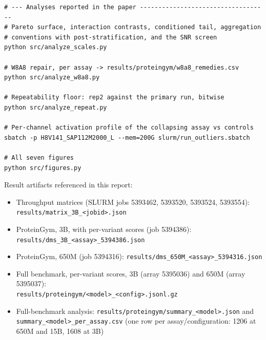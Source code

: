 \documentclass[11pt]{article}
\begin{document}
\begin{footnotesize}
\begin{verbatim}
# --- Analyses reported in the paper -----------------------------------
# Pareto surface, interaction contrasts, conditioned tail, aggregation
# conventions with post-stratification, and the SNR screen
python src/analyze_scales.py

# W8A8 repair, per assay -> results/proteingym/w8a8_remedies.csv
python src/analyze_w8a8.py

# Repeatability floor: rep2 against the primary run, bitwise
python src/analyze_repeat.py

# Per-channel activation profile of the collapsing assay vs controls
sbatch -p H8V141_SAP112M2000_L --mem=200G slurm/run_outliers.sbatch

# All seven figures
python src/figures.py
\end{verbatim}
\end{footnotesize}

\noindent
Result artifacts referenced in this report:

\begin{footnotesize}
\begin{itemize}\setlength{\itemsep}{0pt}
  \item Throughput matrices (SLURM jobs 5393462, 5393520, 5393524, 5393554):\\
        \texttt{results/matrix\_3B\_<jobid>.json}
  \item ProteinGym, 3B, with per-variant scores (job 5394386):\\
        \texttt{results/dms\_3B\_<assay>\_5394386.json}
  \item ProteinGym, 650M (job 5394316):
        \texttt{results/dms\_650M\_<assay>\_5394316.json}
  \item Full benchmark, per-variant scores, 3B (array 5395036) and
        650M (array 5395037):\\
        \texttt{results/proteingym/<model>\_<config>.jsonl.gz}
  \item Full-benchmark analysis:
        \texttt{results/proteingym/summary\_<model>.json} and\\
        \texttt{summary\_<model>\_per\_assay.csv} (one row per
        assay/configuration: 1206 at 650M and 15B, 1608 at 3B)
\end{itemize}
\end{footnotesize}
\end{document}
